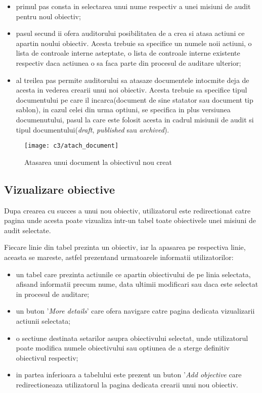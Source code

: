 \begin{itemize}
	\item primul pas consta in selectarea unui nume respectiv a unei misiuni de audit pentru noul obiectiv;
	
	\item pasul secund ii ofera auditorului posibilitatea de a crea si atasa actiuni ce apartin noului obiectiv. Acesta trebuie sa specifice un numele noii actiuni, o lista de controale interne asteptate, o lista de controale interne existente respectiv daca actiunea o sa faca parte din procesul de auditare ulterior;
	
	\item al treilea pas permite  auditorului sa atasaze documentele intocmite deja de acesta in vederea crearii unui noi obiectiv. Acesta trebuie sa specifice tipul documentului pe care il incarca(document de sine statator sau document tip sablon), in cazul celei din urma optiuni, se specifica in plus versiunea documenutului, pasul la care este folosit acesta in cadrul misiunii de audit  si tipul documentului(\textit{draft}, \textit{published} sau \textit{archived}).
\end{itemize}

\vspace{1cm}
\begin{figure}[h]
	\centering
	
	\texttt{[image: c3/atach\_document]}
	\caption{Atasarea unui document la obiectivul nou creat}
\end{figure}


\subsection*{Vizualizare obiective}
Dupa crearea cu succes a unui nou obiectiv, utilizatorul este redirectionat catre pagina unde acesta poate vizualiza intr-un tabel toate obiectivele unei misiuni de audit selectate.

Fiecare linie din tabel prezinta un obiectiv, iar la apasarea pe respectiva linie, aceasta se mareste, astfel prezentand urmatoarele informatii utilizatorilor:
	\begin{itemize}
	
		\item un tabel care prezinta actiunile ce apartin obiectivului de pe linia selectata, afisand informatii precum nume, data ultimii modificari sau daca este selectat in procesul de auditare;
		
		\item un buton '\textit{More details}' care ofera navigare catre pagina dedicata vizualizarii actiunii selectata;
		
		\item o sectiune destinata setarilor asupra obiectivului selectat, unde utilizatorul poate modifica numele obiectivului sau optiunea de a sterge definitiv obiectivul respectiv;
		
		\item in partea inferioara a tabelului este prezent un buton '\textit{Add objective} care redirectioneaza utilizatorul la pagina dedicata crearii unui nou obiectiv.
		
	
	\end{itemize}



